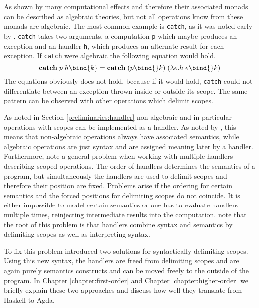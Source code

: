 As shown by \textcite{DBLP:conf/fossacs/PlotkinP02} many computational effects
and therefore their associated monads can be described as algebraic theories,
but not all operations know from these monads are algebraic.
The most common example is \texttt{catch}, as it was noted early by
\textcite{DBLP:journals/acs/PlotkinP03}.
\texttt{catch} takes two arguments, a computation \texttt{p} which maybe
produces an exception and an handler \texttt{h}, which produces an alternate
result for each exception.
If \texttt{catch} were algebraic the following equation would hold.
\[
  \textbf{catch}\; p\; h \bind{k} = \textbf{catch}\;(p\bind{} k)\;(\lambda
  e.h\; e \bind{} k)
\]
The equations obviously does not hold, because if it would hold, \texttt{catch}
could not differentiate between an exception thrown inside or outside its scope.
The same pattern can be observed with other operations which delimit scopes.

As noted in Section \ref{preliminaries:handler} non-algebraic and in particular
operations with scopes can be implemented as a handler.
As noted by \textcite{DBLP:conf/lics/PirogSWJ18}, this means that non-algebraic
operations always have associated semantics, while algebraic operations are just
syntax and are assigned meaning later by a handler.
Furthermore, \textcite{DBLP:conf/haskell/WuSH14} note a general problem when
working with multiple handlers describing scoped operations.
The order of handlers determines the semantics of a program, but simultaneously
the handlers are used to delimit scopes and therefore their position are fixed.
Problems arise if the ordering for certain semantics and the forced positions
for delimiting scopes do not coincide.
It is either impossible to model certain semantics or one has to evaluate
handlers multiple times, reinjecting intermediate results into the
computation.
\textcite{DBLP:conf/haskell/WuSH14} note that the root of this problem is that
handlers combine syntax and semantics by delimiting scopes as well as
interpreting syntax.

To fix this problem \textcite{DBLP:conf/haskell/WuSH14} introduced two solutions
for syntactically delimiting scopes.
Using this new syntax, the handlers are freed from delimiting scopes and are
again purely semantics constructs and can be moved freely to the outside of the
program.
In Chapter \ref{chapter:first-order} and Chapter \ref{chapter:higher-order} we
briefly explain these two approaches and discuss how well they translate from
Haskell to Agda.

